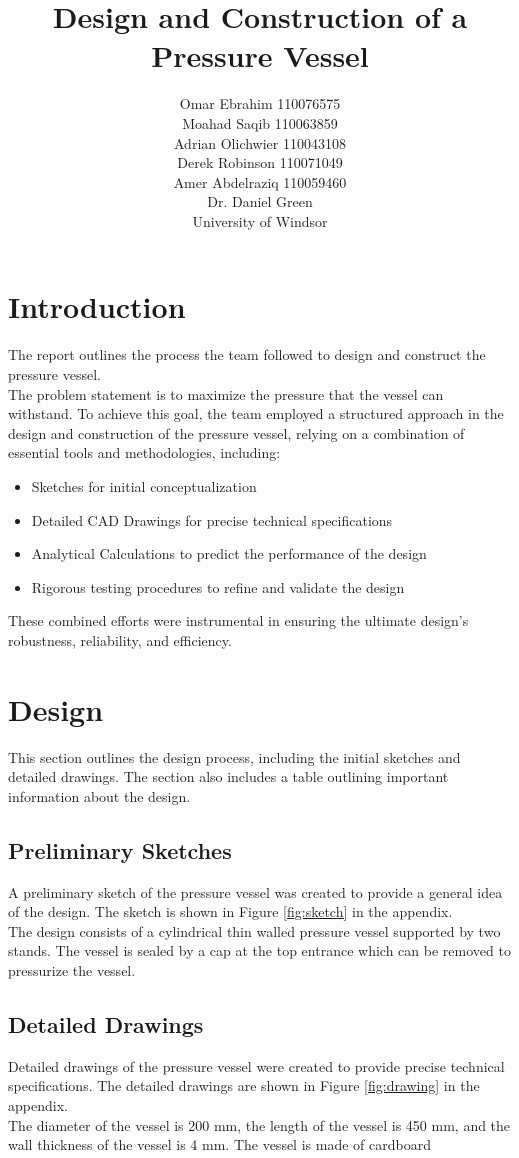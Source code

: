 \documentclass[12pt, titlepage]{article}
\title{Design and Construction of a Pressure Vessel}
\author{Omar Ebrahim 110076575\\Moahad Saqib 110063859\\
  Adrian Olichwier 110043108\\Derek Robinson 110071049\\
  Amer Abdelraziq 110059460\\[10pt]
  Dr. Daniel Green\\ University of Windsor}
\begin{document}
\maketitle
\newpage
\tableofcontents
\listoffigures
\listoftables
\thispagestyle{tocstyle}
\newpage
\section{Introduction}
The report outlines the process the team followed to design and construct
the pressure vessel.\\[10pt]
The problem statement is to maximize the pressure that the vessel can withstand.
To achieve this goal, the team employed a structured approach in the design and
construction of the pressure vessel, relying on a combination of essential
tools and methodologies, including:
\begin{itemize}
    \item Sketches for initial conceptualization
    \item Detailed CAD Drawings for precise technical specifications
    \item Analytical Calculations to predict the performance of the design
    \item Rigorous testing procedures to refine and validate the design
\end{itemize}
These combined efforts were instrumental in ensuring the ultimate design's
robustness, reliability, and efficiency.
\newpage
\section{Design}
This section outlines the design process, including the initial sketches and
detailed drawings. The section also includes a table outlining important 
information about the design.
\subsection{Preliminary Sketches}
A preliminary sketch of the pressure vessel was created to provide a general
idea of the design. The sketch is shown in Figure \ref{fig:sketch} in 
the appendix.\\[10pt]
The design consists of a cylindrical thin walled pressure vessel supported by
two stands. The vessel is sealed by a cap at the top entrance which
can be removed to pressurize the vessel.
\subsection{Detailed Drawings}
Detailed drawings of the pressure vessel were created to provide precise
technical specifications. The detailed drawings are shown in Figure
\ref{fig:drawing} in the appendix.\\[10pt]
The diameter of the vessel is 200 mm, the length of the vessel is 450 mm,
and the wall thickness of the vessel is 4 mm. The vessel is made of cardboard
\end{document}
